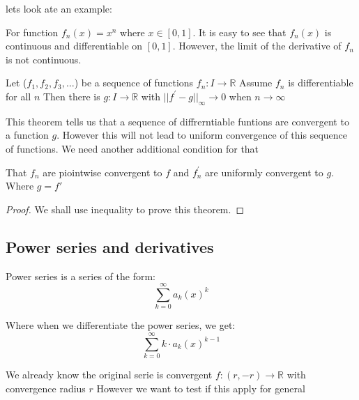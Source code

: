 \documentclass{article}
\newcommand{\R}{\mathbb{R}}
\begin{document}
lets look ate an example:
\begin{example}
  For function $f_n(x)=x^n$ where $x\in [0,1]$. It is easy to see that $f_n(x)$ is continuous and differentiable on $[0,1]$. However, the limit of the derivative of $f_n$ is not continuous. 
\end{example}

\begin{theorem}
Let ($f_1,f_2,f_3,\dots$) be a sequence of functions  $f_n:I\to \R$ 
Assume $f_n$ is differentiable for all $n$
Then there is $g:I\to \R$ with $||f^{'}-g||_{\infty} \to 0$ when $n\to \infty$
\end{theorem}
This theorem tells us that a sequence of diffrerntiable funtions are convergent to a function \(g\).
However this will not lead to uniform convergence of this sequence of functions.
We need another additional condition for that

\begin{center}
  That $f_n$ are piointwise convergent to $f$ and $f_n^{'}$ are uniformly convergent to $g$. Where $g=f'$
\end{center}


\begin{proof}
  We shall use inequality to prove this theorem.
\end{proof}

\subsection{Power series and derivatives}
\begin{definition}
Power series is a series of the form:
\begin{equation}
  \sum_{k=0}^\infty a_k(x)^k
  \label{eq:Power series}
\end{equation}
\end{definition}

Where when we differentiate the power series, we get:
\begin{equation}
  \sum_{k=0}^\infty k\cdot a_k(x)^{k-1}
  \label{eq:diff of PS}
\end{equation}

We already know the original serie is convergent $f:(r,-r)\to \R$ with convergence radius
$r$
However we want to test if this apply for general
\end{document}

